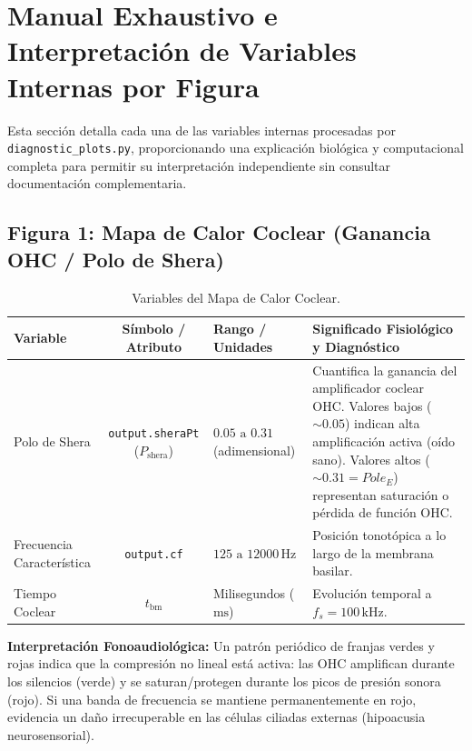 \documentclass[12pt,a4paper]{article}
\begin{document}
\newpage
\section{Manual Exhaustivo e Interpretación de Variables Internas por Figura}

Esta sección detalla cada una de las variables internas procesadas por \texttt{diagnostic\_plots.py}, proporcionando una explicación biológica y computacional completa para permitir su interpretación independiente sin consultar documentación complementaria.

\subsection{Figura 1: Mapa de Calor Coclear (Ganancia OHC / Polo de Shera)}

\begin{table}[H]
\centering
\caption{Variables del Mapa de Calor Coclear.}
\begin{tabular}{l c l p{6cm}}
\toprule
\textbf{Variable} & \textbf{Símbolo / Atributo} & \textbf{Rango / Unidades} & \textbf{Significado Fisiológico y Diagnóstico} \\
\midrule
Polo de Shera & \texttt{output.sheraPt} ($P_{\text{shera}}$) & $0.05 \text{ a } 0.31$ (adimensional) & Cuantifica la ganancia del amplificador coclear OHC. Valores bajos ($\sim 0.05$) indican alta amplificación activa (oído sano). Valores altos ($\sim 0.31 = Pole_E$) representan saturación o pérdida de función OHC. \\
Frecuencia Característica & \texttt{output.cf} & $125 \text{ a } 12000\,\text{Hz}$ & Posición tonotópica a lo largo de la membrana basilar. \\
Tiempo Coclear & $t_{\text{bm}}$ & Milisegundos ($\text{ms}$) & Evolución temporal a $f_s = 100\,\text{kHz}$. \\
\bottomrule
\end{tabular}
\end{table}

\textbf{Interpretación Fonoaudiológica:} Un patrón periódico de franjas verdes y rojas indica que la compresión no lineal está activa: las OHC amplifican durante los silencios (verde) y se saturan/protegen durante los picos de presión sonora (rojo). Si una banda de frecuencia se mantiene permanentemente en rojo, evidencia un daño irrecuperable en las células ciliadas externas (hipoacusia neurosensorial).
\end{document}
